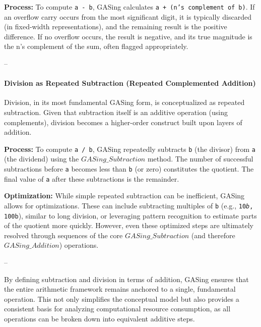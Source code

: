 \noindent\textbf{\textbf{Process:} } To compute \texttt{a - b}, GASing calculates \texttt{a + (n's complement of b)}. If an overflow carry occurs from the most significant digit, it is typically discarded (in fixed-width representations), and the remaining result is the positive difference. If no overflow occurs, the result is negative, and its true magnitude is the n's complement of the sum, often flagged appropriately.





\noindent --

\paragraph{Division as Repeated Subtraction (Repeated Complemented Addition)}

Division, in its most fundamental GASing form, is conceptualized as repeated subtraction. Given that subtraction itself is an additive operation (using complements), division becomes a higher-order construct built upon layers of addition.


\noindent\textbf{\textbf{Process:} } To compute \texttt{a / b}, GASing repeatedly subtracts \texttt{b} (the divisor) from \texttt{a} (the dividend) using the \texttt{$GASing\_{Subtraction}$} method. The number of successful subtractions before \texttt{a} becomes less than \texttt{b} (or zero) constitutes the quotient. The final value of \texttt{a} after these subtractions is the remainder.


\noindent\textbf{\textbf{Optimization:} } While simple repeated subtraction can be inefficient, GASing allows for optimizations. These can include subtracting multiples of \texttt{b} (e.g., \texttt{10\emph{b}, \texttt{100}b}), similar to long division, or leveraging pattern recognition to estimate parts of the quotient more quickly. However, even these optimized steps are ultimately resolved through sequences of the core \texttt{$GASing\_{Subtraction}$} (and therefore \texttt{$GASing\_{Addition}$}) operations.



\noindent --


By defining subtraction and division in terms of addition, GASing ensures that the entire arithmetic framework remains anchored to a single, fundamental operation. This not only simplifies the conceptual model but also provides a consistent basis for analyzing computational resource consumption, as all operations can be broken down into equivalent additive steps.
